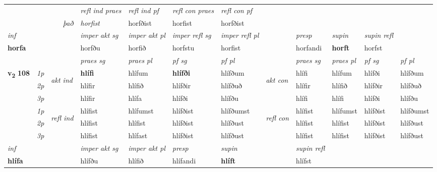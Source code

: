 \begin{longtable}[l]{X>{\footnotesize\itshape}llXXXXlXXXX}
\cmidrule{4-7}
 & && \textit{refl ind praes} & \textit{refl ind pf} & \textit{refl con praes} & \textit{refl con pf} \\*
\multicolumn{3}{r}{\textit{það}}& horfist & horfðist & horfist & horfðist \\*

\cmidrule{4-7}
   {\textit{inf}} & &  & \textit{imper akt sg} & \textit{imper akt pl} & \textit{imper refl sg} & \textit{imper refl pl} && \textit{presp} & \textit{supin} & \textit{supin refl}  \\*
  {\textbf{horfa}} & && horfðu  & horfið & horfstu & horfist && horfandi &  \textbf{horft} & horfst  \\*

\midrule

 & &   & \textit{praes sg}  & \textit{praes pl}    & \textit{ pf sg} & \textit{pf pl} & & \textit{praes sg}  & \textit{praes pl}    & \textit{pf sg} & \textit{pf pl }  \\ \cmidrule{4-7} \cmidrule{9-12}
 \multirow{2}{*}{{{\textbf{v{\textsubscript{2}}} \Large{\textbf{108}}}}}  & 1p & \multirow{3}{*}{\begin{turn}{90}\textit{akt ind}\end{turn}} & \textbf{hlífi} & hlífum & \textbf{hlífði} & hlífðum & \multirow{3}{*}{\begin{turn}{90}\textit{akt con}\end{turn}} &hlífi & hlífum & hlífði & hlífðum\\*
 & 2p &  &  hlífir  & hlífið & hlífðir & hlífðuð & & hlífir & hlífið & hlífðir & hlífðuð \\*
 & 3p &  & hlífir & hlífa & hlífði & hlífðu & & hlífi & hlífi& hlífði & hlífðu \\*
\cmidrule{4-7} \cmidrule{9-12}
 & 1p & \multirow{3}{*}{\begin{turn}{90}\textit{refl ind}\end{turn}}  & hlífist & hlífumst & hlífðist & hlífðumst & \multirow{3}{*}{\begin{turn}{90}\textit{refl con}\end{turn}}  &hlífist & hlífumst & hlífðist & hlífðumst \\*
 & 2p &  & hlífist & hlífist & hlífðist & hlífðust & &hlífist & hlífist & hlífðist & hlífðust \\*
 & 3p  & & hlífist & hlífast & hlífðist & hlífðust & & hlífist & hlífist& hlífðist & hlífðust \\*
\cmidrule{4-7} \cmidrule{9-12}

   {\textit{inf}} & &  & \textit{imper akt sg} & \textit{imper akt pl}   & \textit{presp} & \textit{supin} && \textit{supin refl}  \\*
  {\textbf{hlífa}} & && hlífðu  & hlífið   & hlífandi &  \textbf{hlíft} && hlífst  \\*


\end{longtable}

